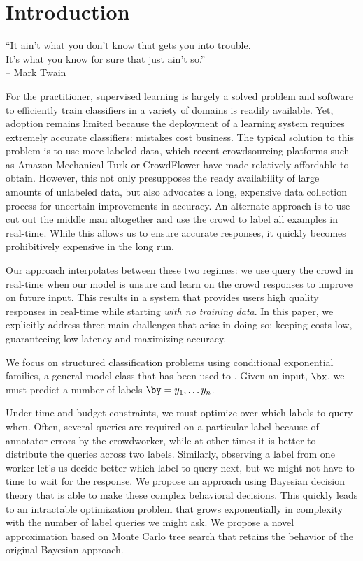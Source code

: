 
\section{Introduction}

\begin{epigraph}
``It ain't what you don't know that gets you into trouble.\\
It's what you know for sure that just ain't so.'' \\
-- Mark Twain
\end{epigraph}

For the practitioner, supervised learning is largely a solved problem and software to efficiently train classifiers in a variety of domains is readily available.
Yet, adoption remains limited because the deployment of a learning system requires extremely accurate classifiers: mistakes cost business.
The typical solution to this problem is to use more labeled data, which recent crowdsourcing platforms such as Amazon Mechanical Turk or CrowdFlower have made relatively affordable to obtain.
However, this not only presupposes the ready availability of large amounts of unlabeled data, but also advocates a long, expensive data collection process for uncertain improvements in accuracy.
An alternate approach is to use cut out the middle man altogether and use the crowd to label all examples in real-time\cite{cheng2015flock}. 
While this allows us to ensure accurate responses, it quickly becomes prohibitively expensive in the long run. 

Our approach interpolates between these two regimes: we use query the crowd in real-time when our model is unsure and learn on the crowd responses to improve on future input.
This results in a system that provides users high quality responses in real-time while starting {\em with no training data}.
In this paper, we explicitly address three main challenges that arise in doing so: keeping costs low, guaranteeing low latency and maximizing accuracy.

We focus on structured classification problems using conditional exponential families, a general model class that has been used to .
Given an input, $\bx$, we must predict a number of labels $\by = y_1, \ldots y_n$.

Under time and budget constraints, we must optimize over which labels to query when. 
Often, several queries are required on a particular label because of annotator errors by the crowdworker, while at other times it is better to distribute the queries across two labels.
Similarly, observing a label from one worker let's us decide better which label to query next, but we might not have to time to wait for the response.
We propose an approach using Bayesian decision theory that is able to make these complex behavioral decisions.
This quickly leads to an intractable optimization problem that grows exponentially in complexity with the number of label queries we might ask.
We propose a novel approximation based on Monte Carlo tree search that retains the behavior of the original Bayesian approach.

